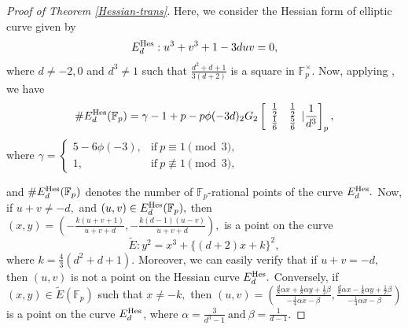 \documentclass[12pt]{amsart}
\theoremstyle{plain}
\theoremstyle{definition}
\theoremstyle{remark}
\newcommand{\F}{\mathbb{F}}
\newcommand{\hes}{\text{{\rm{Hes}}}}
\numberwithin{equation}{section}
\begin{document}
\begin{proof}[Proof of Theorem \ref{Hessian-trans}]
Here, we consider the Hessian form of elliptic curve given by $$E^{\hes}_d:u^3+v^3+1-3duv=0,$$ where 
$d\neq-2,0$ and $d^3\neq1$ such that $\frac{d^2+d+1}{3(d+2)}$ is a square in $\F_p^{\times}.$ Now,  applying \cite[Theorem 3.3]{BS1}, we have 
\begin{align}\label{eq-1024}
\#E^{\hes}_d(\F_p)=\gamma-1+p-p\phi(-3d){}_2G_2\left[\begin{array}{cc}
  \frac{1}{2}   & \frac{1}{2}  \\
  \frac{1}{6}    & \frac{5}{6}  \end{array}|\frac{1}{d^3}\right]_p,
\end{align}
where $\gamma=\begin{cases}
    5-6\phi(-3), & \text{if} \ p \equiv 1 \pmod{3},\\1, &  \text{if}\ p\not\equiv 1 \pmod{3},
\end{cases}$

\noindent and $\#E^{\hes}_d(\F_p)$ denotes the number of $\F_p$-rational points of the curve $E^{\hes}_d.$ Now, if $u+v\neq-d,$ and $(u,v)\in E^{\hes}_d(\F_p),$ then $(x,y)=\left(-\frac{k(u+v+1)}{u+v+d},-\frac{k(d-1)(u-v)}{u+v+d}\right),$ is a point on the curve 
$$\widetilde{E}:y^2=x^3+\{(d+2)x+k\}^2,$$ where $k=\frac{4}{3}(d^2+d+1).$  Moreover, we can easily verify that if $u+v=-d,$ then $(u,v)$ is not a point on the Hessian curve $E^{\hes}_d.$ 
Conversely, if $(x,y)\in \widetilde{E}(\F_p)$ such that $x\neq-k,$ then $(u,v)=\left(\frac{\frac{d}{8}\alpha x+\frac{1}{8}\alpha y+\frac{1}{2}\beta}{-\frac{1}{4}\alpha x-\beta},\frac{\frac{d}{8}\alpha x-\frac{1}{8}\alpha y+\frac{1}{2}\beta}{-\frac{1}{4}\alpha x-\beta}\right)$ is a point on the curve $E^{\hes}_d$, where $\alpha=\frac{3}{d^3-1}\  \text{and} \  \beta=\frac{1}{d-1}.$


\end{proof}
\end{document}
